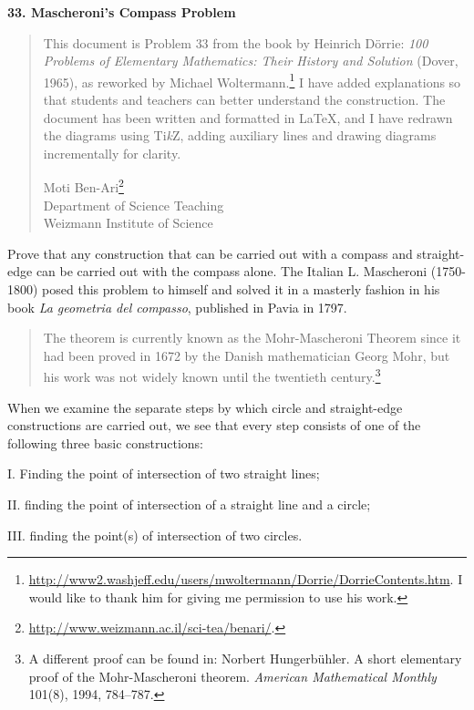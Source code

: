\documentclass[11pt,a4paper]{article}
\begin{document}
\textbf{\LARGE 33. Mascheroni's Compass Problem}

\begin{quote}
This document is Problem $33$ from the book by Heinrich D\"{o}rrie: \textit{100 Problems of Elementary Mathematics: Their History and Solution} (Dover, 1965), as reworked by Michael Woltermann.\footnote{\url{http://www2.washjeff.edu/users/mwoltermann/Dorrie/DorrieContents.htm}. I would like to thank him for giving me permission to use his work.} I have added explanations so that students and teachers can better understand the construction. The document has been written and formatted in \LaTeX{}, and I have redrawn the diagrams using Ti\textit{k}Z, adding auxiliary lines and  drawing diagrams incrementally for clarity.

Moti Ben-Ari\footnote{\url{http://www.weizmann.ac.il/sci-tea/benari/}.}\\
Department of Science Teaching\\
Weizmann Institute of Science
\end{quote}

\bigskip


Prove that any construction that can be carried out with a compass and straight-edge can be carried out with the compass alone. The Italian L. Mascheroni (1750-1800) posed this problem to himself and solved it in a masterly fashion in his book \textit{La geometria del compasso}, published in Pavia in 1797.

\begin{quote}
The theorem is currently known as the Mohr-Mascheroni Theorem since it had been proved in 1672 by the Danish mathematician Georg Mohr, but his work was not widely known until the twentieth century.\footnote{A different proof can be found in: Norbert Hungerb\"{u}hler. A short elementary proof of the Mohr-Mascheroni theorem. \textit{American Mathematical Monthly} 101(8), 1994, 784--787.}
\end{quote}

When we examine the separate steps by which circle and straight-edge constructions are carried out, we see that every step consists of one of the following three basic constructions:

I. Finding the point of intersection of two straight lines;

II. finding the point of intersection of a straight line and a circle;

III. finding the point(s) of intersection of two circles.
\end{document}
